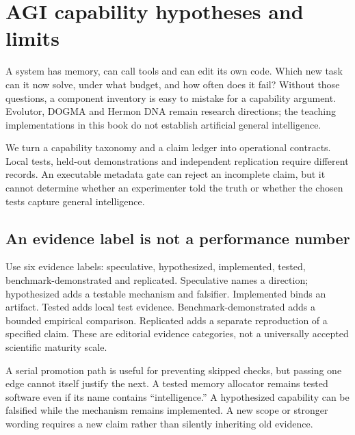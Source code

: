 \chapter{AGI capability hypotheses and limits}
\label{evod51:chapter}
A system has memory, can call tools and can edit its own code. Which new
task can it now solve, under what budget, and how often does it fail? Without
those questions, a component inventory is easy to mistake for a capability
argument. Evolutor, DOGMA and Hermon DNA remain research directions; the
teaching implementations in this book do not establish artificial general
intelligence.

We turn a capability taxonomy and a claim ledger into operational contracts. Local tests, held-out demonstrations and independent replication
require different records. An executable metadata gate can reject an incomplete
claim, but it cannot determine whether an experimenter told the truth or whether
the chosen tests capture general intelligence.

\section{An evidence label is not a performance number}
Use six evidence labels: speculative, hypothesized, implemented,
tested, benchmark-demonstrated and replicated. Speculative names a direction;
hypothesized adds a testable mechanism and falsifier. Implemented binds an
artifact. Tested adds local test evidence. Benchmark-demonstrated adds a bounded
empirical comparison. Replicated adds a separate reproduction of a specified
claim. These are editorial evidence categories, not a universally accepted
scientific maturity scale.

A serial promotion path is useful for preventing skipped checks, but passing
one edge cannot itself justify the next. A tested memory allocator remains
tested software even if its name contains ``intelligence.'' A hypothesized
capability can be falsified while the mechanism remains implemented. A new
scope or stronger wording requires a new claim rather than silently inheriting
old evidence.


